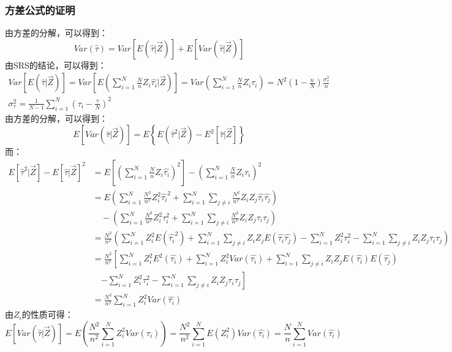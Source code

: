 \subsubsection{方差公式的证明}
由方差的分解，可以得到：
\begin{equation*}
	Var(\hat{\tau})=Var[E(\hat{\tau}|\overrightarrow{Z})]+E[Var(\hat{\tau}|\overrightarrow{Z})] 
\end{equation*}
由SRS的结论，可以得到：
\begin{gather*}
	Var[E(\hat{\tau}|\overrightarrow{Z})]=Var\left[E\left(\sum_{i=1}^{N}\frac{N}{n}Z_i\hat{\tau_i}|\overrightarrow{Z}\right)\right]=Var\left(\sum_{i=1}^{N}\frac{N}{n}Z_i\tau_i\right)=N^2\left(1-\frac{n}{N}\right)\frac{\sigma_\tau^2}{n}\\
	\sigma_\tau^2=\frac{1}{N-1}\sum_{i=1}^{N}\left(\tau_i-\frac{\tau}{N}\right)^2
\end{gather*}
由方差的分解，可以得到：
\begin{equation*}
	E[Var(\hat{\tau}|\overrightarrow{Z})]
	=E\left\{E(\hat{\tau}^2|\overrightarrow{Z})-
	E^2[\hat{\tau}|\overrightarrow{Z}]\right\}
\end{equation*}
而：
\begin{align*}
	E[\hat{\tau}^2|\overrightarrow{Z}]-E[\hat{\tau}|\overrightarrow{Z}]^2
	&=E\left[\left(\sum_{i=1}^{N}\frac{N}{n}Z_i\hat{\tau_i}\right)^2\right]-\left(\sum_{i=1}^{N}\frac{N}{n}Z_i\tau_i\right)^2 \\
	&=E\left(\sum_{i=1}^{N}\frac{N^2}{n^2}Z_i^2\hat{\tau_i}^2+\sum_{i=1}^{N}\sum_{j\ne i}\frac{N^2}{n^2}Z_iZ_j\hat{\tau_i}\hat{\tau_j}\right) \\
	&\quad-\left(\sum_{i=1}^{N}\frac{N^2}{n^2}Z_i^2\tau_i^2+\sum_{i=1}^{N}\sum_{j\ne i}\frac{N^2}{n^2}Z_iZ_j\tau_i\tau_j\right) \\
	&=\frac{N^2}{n^2}\left(\sum_{i=1}^{N}Z_i^2E(\hat{\tau_i}^2)+\sum_{i=1}^{N}\sum_{j\ne i}Z_iZ_jE(\hat{\tau_i}\hat{\tau_j})-\sum_{i=1}^{N}Z_i^2\tau_i^2-\sum_{i=1}^{N}\sum_{j\ne i}Z_iZ_j\tau_i\tau_j\right) \\
	&=\frac{N^2}{n^2}\left[\sum_{i=1}^{N}Z_i^2E^2(\hat{\tau_i})+\sum_{i=1}^{N}Z_i^2Var(\hat{\tau_i})+\sum_{i=1}^{N}\sum_{j\ne i}Z_iZ_jE(\hat{\tau_i})E(\hat{\tau_j})\right.\\
	&\quad\left.-\sum_{i=1}^{N}Z_i^2\tau_i^2-\sum_{i=1}^{N}\sum_{j\ne i}Z_iZ_j\tau_i\tau_j\right] \\
	&=\frac{N^2}{n^2}\sum_{i=1}^{N}Z_i^2Var(\hat{\tau_i})
\end{align*}
由$Z_i$的性质可得：
\begin{equation*}
	E[Var(\hat{\tau}|\overrightarrow{Z})]=E\left(\frac{N^2}{n^2}\sum_{i=1}^{N}Z_i^2Var(\hat{\tau_i})\right)=\frac{N^2}{n^2}\sum_{i=1}^{N}E(Z_i^2)Var(\hat{\tau_i})=\frac{N}{n}\sum_{i=1}^{N}Var(\hat{\tau_i})
\end{equation*}
